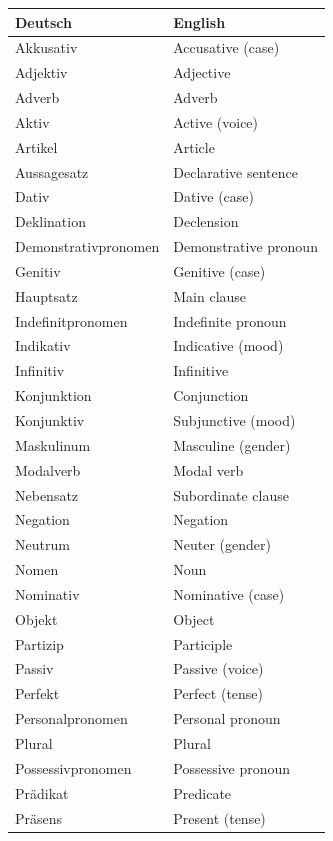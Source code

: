\bigskip
\begin{center}
\begin{tabular}{|l|l|}
\hline
Deutsch & English \\ \hline
Akkusativ & Accusative (case) \\ \hline
Adjektiv & Adjective \\ \hline
Adverb & Adverb \\ \hline
Aktiv & Active (voice) \\ \hline
Artikel & Article \\ \hline
Aussagesatz & Declarative sentence \\ \hline
Dativ & Dative (case) \\ \hline
Deklination & Declension \\ \hline
Demonstrativpronomen & Demonstrative pronoun \\ \hline
Genitiv & Genitive (case) \\ \hline
Hauptsatz & Main clause \\ \hline
Indefinitpronomen & Indefinite pronoun \\ \hline
Indikativ & Indicative (mood) \\ \hline
Infinitiv & Infinitive \\ \hline
Konjunktion & Conjunction \\ \hline
Konjunktiv & Subjunctive (mood) \\ \hline
Maskulinum & Masculine (gender) \\ \hline
Modalverb & Modal verb \\ \hline
Nebensatz & Subordinate clause \\ \hline
Negation & Negation \\ \hline
Neutrum & Neuter (gender) \\ \hline
Nomen & Noun \\ \hline
Nominativ & Nominative (case) \\ \hline
Objekt & Object \\ \hline
Partizip & Participle \\ \hline
Passiv & Passive (voice) \\ \hline
Perfekt & Perfect (tense) \\ \hline
Personalpronomen & Personal pronoun \\ \hline
Plural & Plural \\ \hline
Possessivpronomen & Possessive pronoun \\ \hline
Prädikat & Predicate \\ \hline
Präsens & Present (tense) \\ \hline

\end{tabular}
\end{center}
